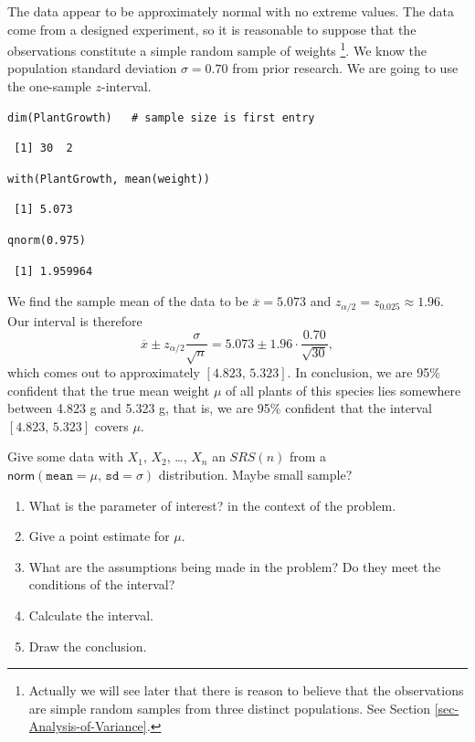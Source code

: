 \documentclass[captions=tableheading]{scrbook}
\begin{document}
The data appear to be approximately normal with no extreme values. The data come from a designed experiment, so it is reasonable to suppose that the observations constitute a simple random sample of weights
\footnote{Actually we will see later that there is reason to believe that the observations are simple random samples from three distinct populations. See Section \ref{sec-Analysis-of-Variance}.}. 
We know the population standard deviation \(\sigma=0.70\) from prior research. We are going to use the one-sample \(z\)-interval.


\begin{verbatim}
dim(PlantGrowth)   # sample size is first entry
\end{verbatim}

\begin{verbatim}
 [1] 30  2
\end{verbatim}


\begin{verbatim}
with(PlantGrowth, mean(weight))
\end{verbatim}

\begin{verbatim}
 [1] 5.073
\end{verbatim}


\begin{verbatim}
qnorm(0.975)
\end{verbatim}

\begin{verbatim}
 [1] 1.959964
\end{verbatim}

We find the sample mean of the data to be \(\overline{x}=5.073\) and \(z_{\alpha/2}=z_{0.025}\approx1.96\). Our interval is therefore
\[
\overline{x}\pm z_{\alpha/2}\frac{\sigma}{\sqrt{n}}=5.073\pm1.96\cdot\frac{0.70}{\sqrt{30}},
\]
which comes out to approximately \([4.823,\,5.323]\). In conclusion, we are 95\% confident that the true mean weight \(\mu\) of all plants of this species lies somewhere between 4.823 g and 5.323 g, that is, we are 95\% confident that the interval \([4.823,\,5.323]\) covers \(\mu\).

\begin{example}
Give some data with \(X_{1}\), \(X_{2}\), \ldots{}, \(X_{n}\) an \(SRS(n)\) from a \(\mathsf{norm}(\mathtt{mean}=\mu,\,\mathtt{sd}=\sigma)\) distribution. Maybe small sample?
\end{example}

\begin{enumerate}
\item What is the parameter of interest? in the context of the problem.
\item Give a point estimate for \(\mu\).
\item What are the assumptions being made in the problem? Do they meet the conditions of the interval?
\item Calculate the interval.
\item Draw the conclusion.
\end{enumerate}
\end{document}
